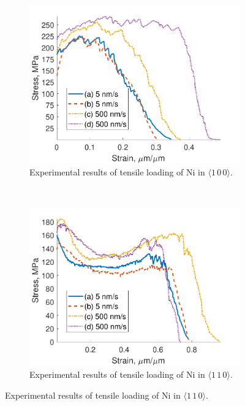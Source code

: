 \begin{figure}
    \centering
    \begin{subfigure}[t]{0.45\linewidth}
        \centering
        \includegraphics[width=\linewidth]{../data/Ni100.pdf}
        \caption{Experimental results of tensile loading of Ni in $\langle 1\, 0\, 0 \rangle$.}
        \label{sf:Ni100}
    \end{subfigure}
    ~
    \begin{subfigure}[t]{0.45\linewidth}
        \centering
        \includegraphics[width=\linewidth]{../data/Ni110.pdf}
        \caption{Experimental results of tensile loading of Ni in  $\langle 1\, 1\, 0 \rangle$.}
        \label{sf:Ni110}
    \end{subfigure}


\end{figure}
